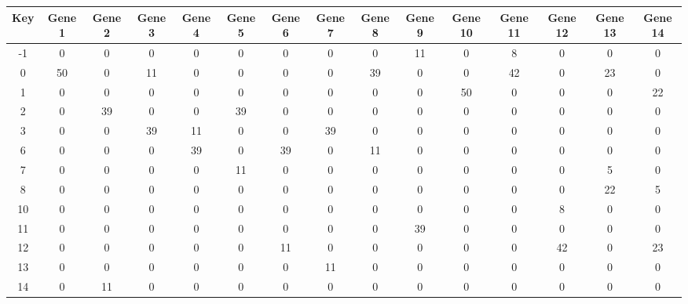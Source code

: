 \begin{tabular}{|c|c|c|c|c|c|c|c|c|c|c|c|c|c|c|}
\hline
Key & Gene 1 & Gene 2 & Gene 3 & Gene 4 & Gene 5 & Gene 6 & Gene 7 & Gene 8 & Gene 9 & Gene 10 & Gene 11 & Gene 12 & Gene 13 & Gene 14 \\
\hline
-1 & 0 & 0 & 0 & 0 & 0 & 0 & 0 & 0 & 11 & 0 & 8 & 0 & 0 & 0 \\
0 & 50 & 0 & 11 & 0 & 0 & 0 & 0 & 39 & 0 & 0 & 42 & 0 & 23 & 0 \\
1 & 0 & 0 & 0 & 0 & 0 & 0 & 0 & 0 & 0 & 50 & 0 & 0 & 0 & 22 \\
2 & 0 & 39 & 0 & 0 & 39 & 0 & 0 & 0 & 0 & 0 & 0 & 0 & 0 & 0 \\
3 & 0 & 0 & 39 & 11 & 0 & 0 & 39 & 0 & 0 & 0 & 0 & 0 & 0 & 0 \\
6 & 0 & 0 & 0 & 39 & 0 & 39 & 0 & 11 & 0 & 0 & 0 & 0 & 0 & 0 \\
7 & 0 & 0 & 0 & 0 & 11 & 0 & 0 & 0 & 0 & 0 & 0 & 0 & 5 & 0 \\
8 & 0 & 0 & 0 & 0 & 0 & 0 & 0 & 0 & 0 & 0 & 0 & 0 & 22 & 5 \\
10 & 0 & 0 & 0 & 0 & 0 & 0 & 0 & 0 & 0 & 0 & 0 & 8 & 0 & 0 \\
11 & 0 & 0 & 0 & 0 & 0 & 0 & 0 & 0 & 39 & 0 & 0 & 0 & 0 & 0 \\
12 & 0 & 0 & 0 & 0 & 0 & 11 & 0 & 0 & 0 & 0 & 0 & 42 & 0 & 23 \\
13 & 0 & 0 & 0 & 0 & 0 & 0 & 11 & 0 & 0 & 0 & 0 & 0 & 0 & 0 \\
14 & 0 & 11 & 0 & 0 & 0 & 0 & 0 & 0 & 0 & 0 & 0 & 0 & 0 & 0 \\
\hline
\end{tabular}